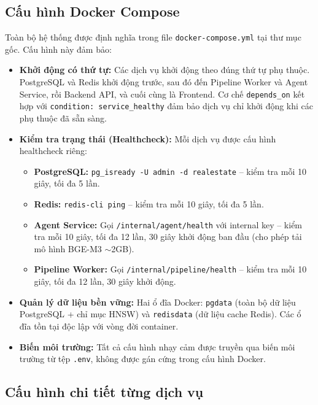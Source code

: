 \subsection{Cấu hình Docker Compose}

Toàn bộ hệ thống được định nghĩa trong file \texttt{docker-compose.yml} tại thư mục gốc. Cấu hình này đảm bảo:

\begin{itemize}
    \item \textbf{Khởi động có thứ tự:} Các dịch vụ khởi động theo đúng thứ tự phụ thuộc. PostgreSQL và Redis khởi động trước, sau đó đến Pipeline Worker và Agent Service, rồi Backend API, và cuối cùng là Frontend. Cơ chế \texttt{depends\_on} kết hợp với \texttt{condition: service\_healthy} đảm bảo dịch vụ chỉ khởi động khi các phụ thuộc đã sẵn sàng.

    \item \textbf{Kiểm tra trạng thái (Healthcheck):} Mỗi dịch vụ được cấu hình healthcheck riêng:
    \begin{itemize}
        \item \textbf{PostgreSQL:} \texttt{pg\_isready -U admin -d realestate} -- kiểm tra mỗi 10 giây, tối đa 5 lần.
        \item \textbf{Redis:} \texttt{redis-cli ping} -- kiểm tra mỗi 10 giây, tối đa 5 lần.
        \item \textbf{Agent Service:} Gọi \texttt{/internal/agent/health} với internal key -- kiểm tra mỗi 10 giây, tối đa 12 lần, 30 giây khởi động ban đầu (cho phép tải mô hình BGE-M3 $\sim$2GB).
        \item \textbf{Pipeline Worker:} Gọi \texttt{/internal/pipeline/health} -- kiểm tra mỗi 10 giây, tối đa 12 lần, 30 giây khởi động.
    \end{itemize}

    \item \textbf{Quản lý dữ liệu bền vững:} Hai ổ đĩa Docker: \texttt{pgdata} (toàn bộ dữ liệu PostgreSQL + chỉ mục HNSW) và \texttt{redisdata} (dữ liệu cache Redis). Các ổ đĩa tồn tại độc lập với vòng đời container.

    \item \textbf{Biến môi trường:} Tất cả cấu hình nhạy cảm được truyền qua biến môi trường từ tệp \texttt{.env}, không được gán cứng trong cấu hình Docker.
\end{itemize}

\subsection{Cấu hình chi tiết từng dịch vụ}

